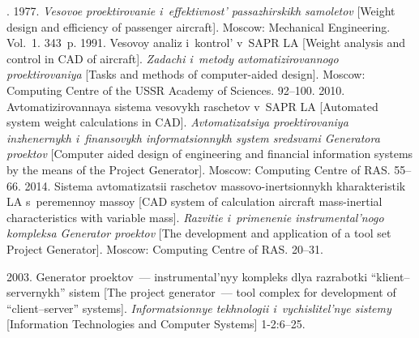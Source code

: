   \begin{multicols}{2}

\renewcommand{\bibname}{\protect\rmfamily References}

{\small\frenchspacing
 {%
 \begin{thebibliography}{9} 
 
 
. 1977. \textit{Vesovoe 
proektirovanie i~effektivnost' passazhirskikh samoletov} [Weight design and 
efficiency of passenger aircraft]. Moscow: Mechanical Engineering. Vol.~1. 343~p.
 1991. Vesovoy analiz i~kontrol' v~SAPR 
LA [Weight analysis and control in CAD of aircraft]. \textit{Zadachi i~metody 
avtomatizirovannogo proektirovaniya} [Tasks and methods of computer-aided 
design]. Moscow: Computing Centre of the USSR Academy of Sciences.  
92--100.
 2010. Avtomatizirovannaya sistema vesovykh raschetov 
v~SAPR LA [Automated system weight calculations in CAD].  
\textit{Avtomatizatsiya proektirovaniya inzhenernykh i~finansovykh 
informatsionnykh system sredsvami Generatora proektov} [Computer 
aided  design of engineering and financial information systems by the means of the 
Project Generator]. Moscow: Computing Centre of RAS. 
55--66.
 2014. Sistema avtomatizatsii 
raschetov massovo-inertsionnykh kharakteristik LA s~peremennoy massoy [CAD 
system of calculation  aircraft mass-inertial characteristics with variable mass].  
\textit{Razvitie i~primenenie instrumental'nogo kompleksa Generator proektov} 
[The development and application of a tool set Project Generator]. 
Moscow: Computing Centre of RAS. 20--31.
{

}

 2003. Generator proektov~--- instrumental'nyy kompleks dlya 
razrabotki ``klient--servernykh'' sistem [The project generator~--- tool complex for 
development of ``client--server'' systems]. 
\textit{Informatsionnye tekhnologii i~vychislitel'nye sistemy} [Information 
Technologies and Computer Systems] 1-2:6--25.

\end{thebibliography}

 }
 }

\end{multicols}

